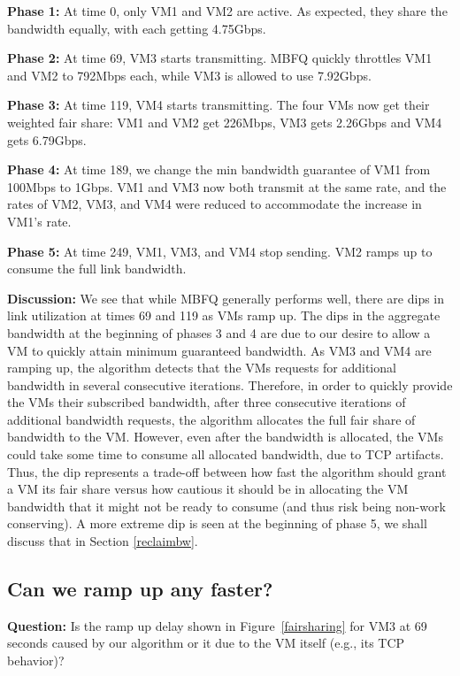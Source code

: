 {\bf Phase 1:}  At time 0, only VM1 and VM2 are active. As expected, they share
the bandwidth equally, with each getting 4.75Gbps.

{\bf Phase 2:} At time 69, VM3 starts transmitting. MBFQ quickly
throttles VM1 and VM2 to 792Mbps each, while VM3 is allowed to use 7.92Gbps. 

{\bf  Phase 3:} At time 119, VM4 starts transmitting. The four VMs now
get their weighted fair share: VM1 and VM2 get 226Mbps, VM3
gets 2.26Gbps and VM4 gets 6.79Gbps. 

{\bf  Phase 4:} At time 189, we change the min bandwidth guarantee of VM1 from
100Mbps to 1Gbps. VM1 and VM3 now both transmit at the same rate, and the rates
of VM2, VM3, and VM4 were reduced to accommodate the increase in VM1's rate.

{\bf Phase 5:} At time 249, VM1, VM3, and VM4 stop sending. VM2
ramps up to consume the full link bandwidth.

{\bf Discussion:} We see that while MBFQ generally performs well, there are dips
in link utilization at times 69 and 119 as VMs ramp up. The dips in the aggregate
bandwidth at the beginning of phases 3
and 4 are due to our desire to allow a VM to quickly attain minimum
guaranteed bandwidth. As VM3 and VM4 are ramping up, the algorithm detects that
the VMs requests for additional bandwidth in several consecutive iterations.
Therefore, in order to quickly provide the VMs their subscribed bandwidth, after
three consecutive iterations of additional bandwidth requests, the algorithm
allocates the full fair share of bandwidth to the VM. However, even after
    the bandwidth is allocated, the VMs could take some time to consume all allocated
bandwidth, due to
TCP artifacts. Thus, the dip represents a trade-off between how fast the
algorithm should grant a VM its fair share versus how cautious it should be in
allocating the VM bandwidth that it might not be ready to consume (and thus risk
being non-work conserving). A more extreme dip is seen at the
beginning of phase 5, we shall discuss that in Section \ref{reclaimbw}.

\subsection{Can we ramp up any faster?}

{\bf Question:}  Is the ramp up delay shown in Figure~\ref{fairsharing} for VM3
at 69 seconds caused by our algorithm or it due to the VM itself (e.g., its TCP
behavior)?


